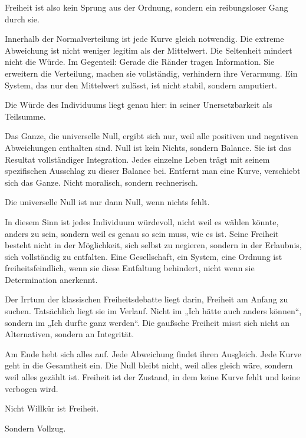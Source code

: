 \documentclass[
  ngerman,
]{article}
\begin{document}
Freiheit ist also kein Sprung aus der Ordnung, sondern ein reibungsloser
Gang durch sie.

Innerhalb der Normalverteilung ist jede Kurve gleich notwendig. Die
extreme Abweichung ist nicht weniger legitim als der Mittelwert. Die
Seltenheit mindert nicht die Würde. Im Gegenteil: Gerade die Ränder
tragen Information. Sie erweitern die Verteilung, machen sie
vollständig, verhindern ihre Verarmung. Ein System, das nur den
Mittelwert zulässt, ist nicht stabil, sondern amputiert.

Die Würde des Individuums liegt genau hier: in seiner Unersetzbarkeit
als Teilsumme.

Das Ganze, die universelle Null, ergibt sich nur, weil alle
positiven und negativen Abweichungen enthalten sind. Null ist kein
Nichts, sondern Balance. Sie ist das Resultat vollständiger Integration.
Jedes einzelne Leben trägt mit seinem spezifischen Ausschlag zu dieser
Balance bei. Entfernt man eine Kurve, verschiebt sich das Ganze. Nicht
moralisch, sondern rechnerisch.

Die universelle Null ist nur dann Null, wenn nichts fehlt.

In diesem Sinn ist jedes Individuum würdevoll, nicht weil es wählen
könnte, anders zu sein, sondern weil es genau so sein muss, wie es ist.
Seine Freiheit besteht nicht in der Möglichkeit, sich selbst zu
negieren, sondern in der Erlaubnis, sich vollständig zu entfalten. Eine
Gesellschaft, ein System, eine Ordnung ist freiheitsfeindlich, wenn sie
diese Entfaltung behindert, nicht wenn sie Determination anerkennt.

Der Irrtum der klassischen Freiheitsdebatte liegt darin, Freiheit am
Anfang zu suchen. Tatsächlich liegt sie im Verlauf. Nicht im „Ich hätte
auch anders können``, sondern im „Ich durfte ganz werden``. Die gaußsche
Freiheit misst sich nicht an Alternativen, sondern an Integrität.

Am Ende hebt sich alles auf. Jede Abweichung findet ihren Ausgleich.
Jede Kurve geht in die Gesamtheit ein. Die Null bleibt nicht, weil alles
gleich wäre, sondern weil alles gezählt ist. Freiheit ist der Zustand,
in dem keine Kurve fehlt und keine verbogen wird.

Nicht Willkür ist Freiheit.

Sondern Vollzug.

\subsection{\texorpdfstring{\hfill\break
}{ }}\label{section-7}
\end{document}
